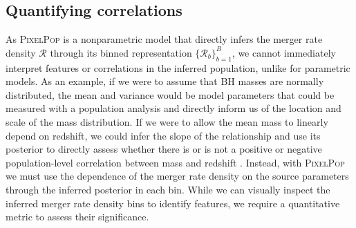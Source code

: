 \documentclass[%
reprint,
 amsmath,amssymb,
 aps,
 prd,nofootinbib,nobibnotes,
 superscriptaddress,groupedaddress,
]{revtex4-2}
\begin{document}
\subsection{Quantifying correlations}
\label{sec: spearman}

As \textsc{PixelPop} is a nonparametric model that directly infers the merger rate density $\mathcal{R}$ through its binned representation $\{\mathcal{R}_b\}_{b=1}^B$, we cannot immediately interpret features or correlations in the inferred population, unlike for parametric models. As an example, if we were to assume that BH masses are normally distributed, the mean and variance would be model parameters that could be measured with a population analysis and directly inform us of the location and scale of the mass distribution. If we were to allow the mean mass to linearly depend on redshift, we could infer the slope of the relationship and use its posterior to directly assess whether there is or is not a positive or negative population-level correlation between mass and redshift \cite{Callister:2021fpo, Biscoveanu:2022qac, Safarzadeh:2020mlb}. Instead, with \textsc{PixelPop} we must use the dependence of the merger rate density on the source parameters through the inferred posterior in each bin. While we can visually inspect the inferred merger rate density bins to identify features, we require a quantitative metric to assess their significance.
\end{document}
